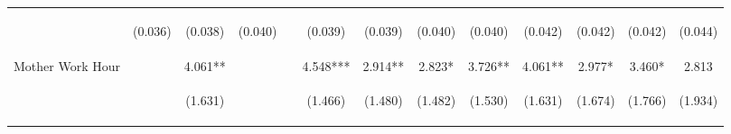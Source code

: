 \begin{tabular}{lcccccccccccc}
 & \begin{footnotesize}(0.036)\end{footnotesize} & \begin{footnotesize}(0.038)\end{footnotesize} & \begin{footnotesize}(0.040)\end{footnotesize} & \begin{footnotesize}\end{footnotesize} & \begin{footnotesize}(0.039)\end{footnotesize} & \begin{footnotesize}(0.039)\end{footnotesize} & \begin{footnotesize}(0.040)\end{footnotesize} & \begin{footnotesize}(0.040)\end{footnotesize} & \begin{footnotesize}(0.042)\end{footnotesize} & \begin{footnotesize}(0.042)\end{footnotesize} & \begin{footnotesize}(0.042)\end{footnotesize} & \begin{footnotesize}(0.044)\end{footnotesize}\\
\noalign{\smallskip}Mother Work Hour &  & 4.061** &  &  & 4.548*** & 2.914** & 2.823* & 3.726** & 4.061** & 2.977* & 3.460* & 2.813\\
 & \begin{footnotesize}\end{footnotesize} & \begin{footnotesize}(1.631)\end{footnotesize} & \begin{footnotesize}\end{footnotesize} & \begin{footnotesize}\end{footnotesize} & \begin{footnotesize}(1.466)\end{footnotesize} & \begin{footnotesize}(1.480)\end{footnotesize} & \begin{footnotesize}(1.482)\end{footnotesize} & \begin{footnotesize}(1.530)\end{footnotesize} & \begin{footnotesize}(1.631)\end{footnotesize} & \begin{footnotesize}(1.674)\end{footnotesize} & \begin{footnotesize}(1.766)\end{footnotesize} & \begin{footnotesize}(1.934)\end{footnotesize}\\

\end{tabular}
